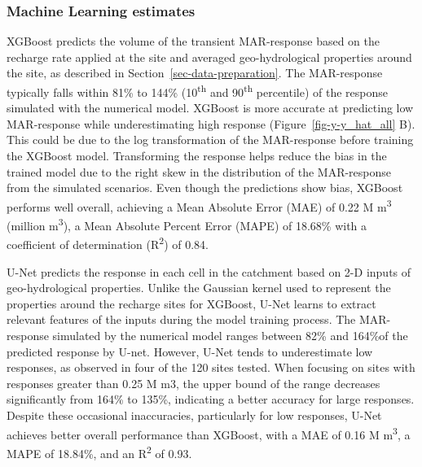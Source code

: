 \documentclass[
]{agujournal2019}
\begin{document}
\subsubsection{Machine Learning
estimates}\label{machine-learning-estimates}

XGBoost predicts the volume of the transient MAR-response based on the
recharge rate applied at the site and averaged geo-hydrological
properties around the site, as described in
Section~\ref{sec-data-preparation}. The MAR-response typically falls
within 81\% to 144\% (10\textsuperscript{th} and 90\textsuperscript{th}
percentile) of the response simulated with the numerical model. XGBoost
is more accurate at predicting low MAR-response while underestimating
high response (Figure~\ref{fig-y-y_hat_all} B). This could be due to the
log transformation of the MAR-response before training the XGBoost
model. Transforming the response helps reduce the bias in the trained
model due to the right skew in the distribution of the MAR-response from
the simulated scenarios. Even though the predictions show bias, XGBoost
performs well overall, achieving a Mean Absolute Error (MAE) of 0.22 M
m\textsuperscript{3} (million m\textsuperscript{3}), a Mean Absolute
Percent Error (MAPE) of 18.68\% with a coefficient of determination
(R\textsuperscript{2}) of 0.84.

U-Net predicts the response in each cell in the catchment based on 2-D
inputs of geo-hydrological properties. Unlike the Gaussian kernel used
to represent the properties around the recharge sites for XGBoost, U-Net
learns to extract relevant features of the inputs during the model
training process. The MAR-response simulated by the numerical model
ranges between 82\% and 164\%of the predicted response by U-net.
However, U-Net tends to underestimate low responses, as observed in four
of the 120 sites tested. When focusing on sites with responses greater
than 0.25 M m3, the upper bound of the range decreases significantly
from 164\% to 135\%, indicating a better accuracy for large responses.
Despite these occasional inaccuracies, particularly for low responses,
U-Net achieves better overall performance than XGBoost, with a MAE of
0.16 M m\textsuperscript{3}, a MAPE of 18.84\%, and an
R\textsuperscript{2} of 0.93.
\end{document}
